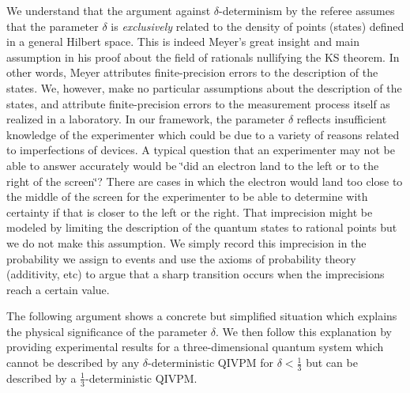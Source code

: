 \documentclass[english,reprint, aps, prl,superscriptaddress, showpacs,
showkeys, longbibliography, amsmath, amssymb, floatfix]{revtex4-1}
\theoremstyle{plain}
\theoremstyle{definition}
\begin{document}
We understand that the argument against $\delta$-determinism by the
referee assumes that the parameter $\delta$ is \emph{exclusively}
related to the density of points (states) defined in a general Hilbert
space. This is indeed Meyer's great insight and main assumption in
his proof about the field of rationals nullifying the KS theorem.
In other words, Meyer attributes finite-precision errors to the description
of the states. We, however, make no particular assumptions about the
description of the states, and attribute finite-precision errors to
the measurement process itself as realized in a laboratory. In our
framework, the parameter $\delta$ reflects insufficient knowledge
of the experimenter which could be due to a variety of reasons related
to imperfections of devices. A typical question that an experimenter
may not be able to answer accurately would be \char`\"{}did an electron
land to the left or to the right of the screen\char`\"{}? There are
cases in which the electron would land too close to the middle of
the screen for the experimenter to be able to determine with certainty
if that is closer to the left or the right. That imprecision might
be modeled by limiting the description of the quantum states to rational
points but we do not make this assumption. We simply record this imprecision
in the probability we assign to events and use the axioms of probability
theory (additivity, etc) to argue that a sharp transition occurs when
the imprecisions reach a certain value. 

The following argument shows a concrete but simplified situation which
explains the physical significance of the parameter $\delta$. We
then follow this explanation by providing experimental results for
a three-dimensional quantum system which cannot be described by any
$\delta$-deterministic QIVPM for $\delta<\frac{1}{3}$ but can be
described by a $\frac{1}{3}$-deterministic QIVPM.
\end{document}
